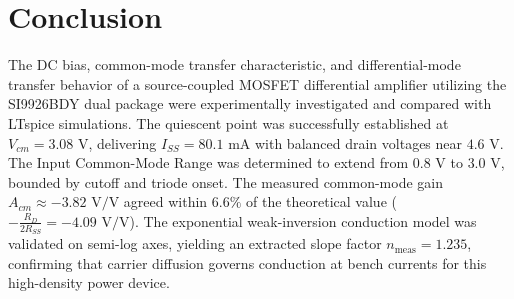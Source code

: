 \documentclass[11pt,a4paper]{article}
\begin{document}
\section{Conclusion}
The DC bias, common-mode transfer characteristic, and differential-mode transfer behavior of a source-coupled MOSFET differential amplifier utilizing the SI9926BDY dual package were experimentally investigated and compared with LTspice simulations. The quiescent point was successfully established at $V_{cm} = 3.08\text{ V}$, delivering $I_{SS} = 80.1\text{ mA}$ with balanced drain voltages near $4.6\text{ V}$. The Input Common-Mode Range was determined to extend from $0.8\text{ V}$ to $3.0\text{ V}$, bounded by cutoff and triode onset. The measured common-mode gain $A_{cm} \approx -3.82\text{ V/V}$ agreed within $6.6\%$ of the theoretical value ($-\frac{R_D}{2 R_{SS}} = -4.09\text{ V/V}$). The exponential weak-inversion conduction model was validated on semi-log axes, yielding an extracted slope factor $n_{\text{meas}} = 1.235$, confirming that carrier diffusion governs conduction at bench currents for this high-density power device.
\end{document}

